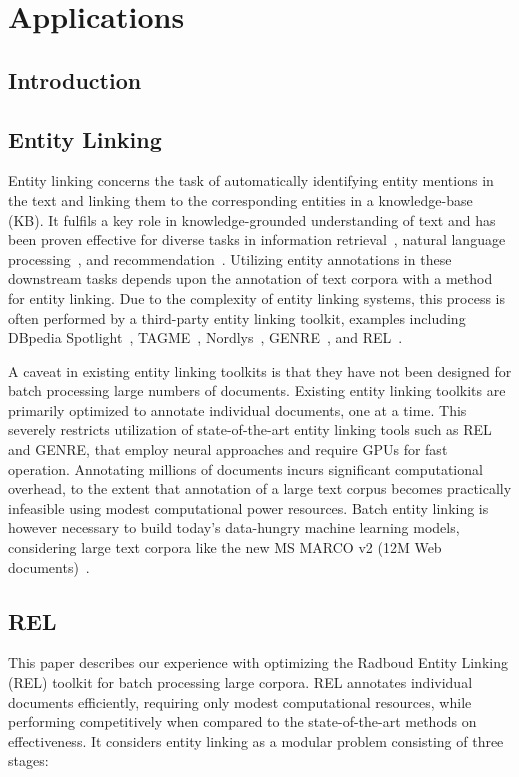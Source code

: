 \chapter{Applications}

\section{Introduction}

\section{Entity Linking}
Entity linking concerns the task of automatically identifying entity mentions in the text and linking them to the corresponding entities in a knowledge-base (KB). It fulfils a key role in knowledge-grounded understanding of text and has been proven effective for diverse tasks in information retrieval~\cite{Gerritse:2022:EMBERT, Gerritse:2020:GEER, doc-ranking-entity, el-ranking-hasibi, el-balog, query-recommendation-entity, chatterjee2022bert}, natural language processing~\cite{lin-etal-2012-entity, watson}, and recommendation~\cite{yang-etal-2018-collective}.
Utilizing entity annotations in these downstream tasks depends upon the annotation of text corpora with a method for entity linking. Due to the complexity of entity linking systems, this process is often performed by a third-party entity linking toolkit, examples including DBpedia Spotlight~\cite{dbpedia-spotlight}, TAGME~\cite{tagme}, Nordlys~\cite{nordlys}, GENRE~\cite{genre}, and REL~\cite{REL}. 

A caveat in existing entity linking toolkits is that they have not been designed for batch processing large numbers of documents. Existing entity linking toolkits are primarily optimized to annotate individual documents, one at a time. This severely restricts utilization of state-of-the-art entity linking tools such as REL and GENRE, that employ neural approaches and require GPUs for fast operation. Annotating millions of documents incurs significant computational overhead, to the extent that annotation of a large text corpus becomes practically infeasible using modest computational power resources. Batch entity linking is however necessary to build today's data-hungry machine learning models, considering large text corpora like the new MS MARCO v2 (12M Web documents)~\cite{msmarco}.

\section{REL}
This paper describes our experience with optimizing the Radboud Entity Linking (REL) toolkit for batch processing large corpora. REL annotates individual documents efficiently, requiring only modest computational resources, while performing competitively when compared to the state-of-the-art methods on effectiveness. It considers entity linking as a modular problem consisting of three stages: 

